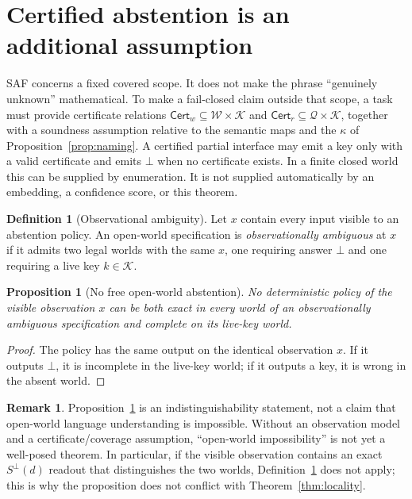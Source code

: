 \documentclass[11pt]{article}
\theoremstyle{definition}
\newtheorem{definition}{Definition}
\newtheorem{remark}{Remark}
\theoremstyle{plain}
\newtheorem{proposition}{Proposition}
\newcommand{\Wr}{\mathcal{W}}
\newcommand{\Qu}{\mathcal{Q}}
\newcommand{\Ky}{\mathcal{K}}
\newcommand{\bt}{\bot}
\begin{document}
\section{Certified abstention is an additional assumption}

SAF concerns a fixed covered scope.  It does not make the phrase ``genuinely
unknown'' mathematical.  To make a fail-closed claim outside that scope, a
task must provide certificate relations
\(\mathsf{Cert}_w\subseteq\Wr\times\Ky\) and
\(\mathsf{Cert}_r\subseteq\Qu\times\Ky\), together with a soundness
assumption relative to the semantic maps and the \(\kappa\) of
Proposition~\ref{prop:naming}.  A certified partial interface may emit a key
only with a valid certificate and emits \(\bt\) when no certificate exists.
In a finite closed world this can be supplied by enumeration.  It is not
supplied automatically by an embedding, a confidence score, or this theorem.

\begin{definition}[Observational ambiguity]\label{def:ambiguity}
Let \(x\) contain every input visible to an abstention policy.  An open-world
specification is \emph{observationally ambiguous} at \(x\) if it admits two
legal worlds with the same \(x\), one requiring answer \(\bt\) and one
requiring a live key \(k\in\Ky\).
\end{definition}

\begin{proposition}[No free open-world abstention]\label{prop:openworld}
No deterministic policy of the visible observation \(x\) can be both exact
in every world of an observationally ambiguous specification and complete on
its live-key world.
\end{proposition}

\begin{proof}
The policy has the same output on the identical observation \(x\).  If it
outputs \(\bt\), it is incomplete in the live-key world; if it outputs a key,
it is wrong in the absent world.
\end{proof}

\begin{remark}
Proposition~\ref{prop:openworld} is an indistinguishability statement, not a
claim that open-world language understanding is impossible.  Without an
observation model and a certificate/coverage assumption, ``open-world
impossibility'' is not yet a well-posed theorem.  In particular, if the
visible observation contains an exact \(S^{\bt}(d)\) readout that distinguishes
the two worlds, Definition~\ref{def:ambiguity} does not apply; this is why
the proposition does not conflict with
Theorem~\ref{thm:locality}.
\end{remark}
\end{document}
